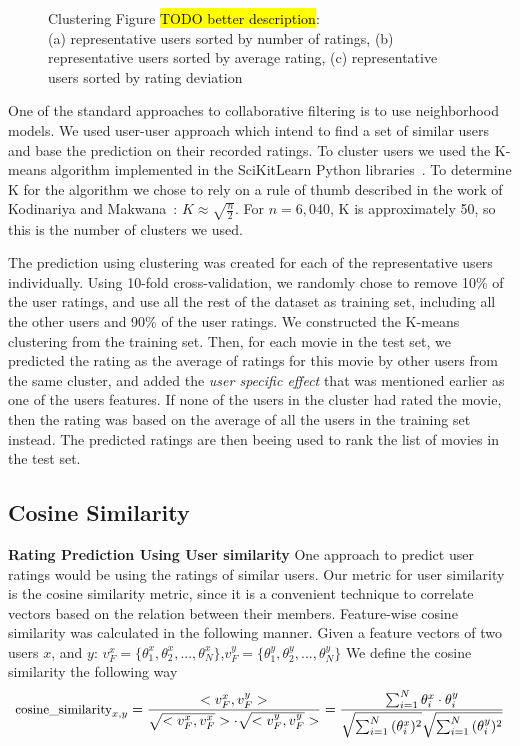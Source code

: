 \begin{figure}
{\begin{tabular}{ c c c}
\end{tabular}
}
\caption{Clustering Figure \hl{TODO better description}: 
\\(a) representative users sorted by number of ratings, (b) representative users sorted by average rating, (c) representative users sorted by rating deviation}
\label{fig:ndcg}  
\end{figure}


One of the standard approaches to collaborative filtering is to use neighborhood models. We used user-user approach which intend to find a set of similar users and base the prediction on their recorded ratings. To cluster users we used the K-means algorithm implemented in the SciKitLearn
Python libraries~\cite{pedregosa2011scikit}. To determine K for the algorithm we chose to rely on a rule of thumb described in the work of Kodinariya and Makwana~\cite{kodinariya2013review}: $K\approx\sqrt{\frac{n}{2}}$. For $n=6,040$, K is approximately 50, so this is the number of clusters we used.

The prediction using clustering was created for each of the representative users individually. Using 10-fold cross-validation, we randomly chose to remove 10\% of the user ratings, and use all the rest of the dataset as training set, including all the other users and 90\% of the user ratings. We constructed the K-means clustering from the training set. Then, for each movie in the test set, we predicted the rating as the average of ratings for this movie by other users from the same cluster, and added the \textit{user specific effect} that was mentioned earlier as one of the users features. If none of the users in the cluster had rated the movie, then the rating was based on the average of all the users in the training set instead. The predicted ratings are then beeing used to rank the list of movies in the test set.

\subsection{Cosine Similarity}

\textbf{Rating Prediction Using User similarity}
One approach to predict user ratings would be using the ratings of similar users. 
Our metric for user similarity is the cosine similarity metric, since it is a convenient technique to correlate vectors based on the relation between their members.
Feature-wise cosine similarity was calculated in the following manner. Given a feature vectors of two users $x$, and $y$: $v^x_{F}=\{\theta^x_{1},\theta^x_{2},...,\theta^x_{N}\}$,$v^y_{F}=\{\theta^y_{1},\theta^y_{2},...,\theta^y_{N}\}$
We define the cosine similarity the following way
\begin{equation}
\footnotesize
\text{cosine\_similarity}_{x,y} = \frac{<v^x_{F},v^y_{F}>}{\sqrt{<v^x_{F},v^x_{F}}> \cdot \sqrt{<v^y_{F},v^y_{F}}>}=\frac{\sum^N_{i=1}{\theta^x_i \cdot \theta^y_i}}{{\sqrt{\sum^N_{i=1}{(\theta^x_i)^2} }}\sqrt{\sum^N_{i=1}{(\theta^y_i)^2 }}}
\label{eq:cosinesimilarity}
\end{equation}


